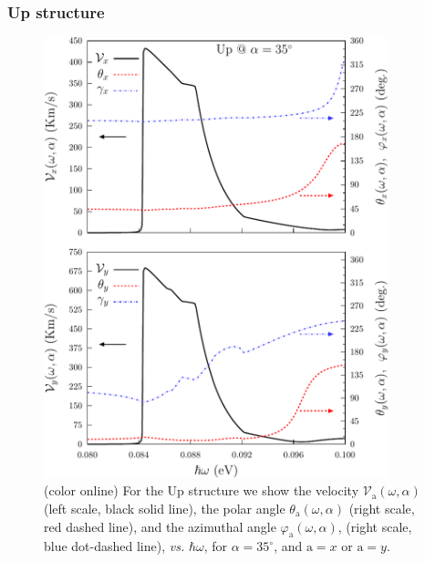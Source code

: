 \documentclass[floatfix,prb,aps,superscriptaddress,showpacs,11pt,preprint,letterpaper]{revtex4}
\def\tama{10cm}
\begin{document}
\subsubsection{Up structure}

\begin{figure}[t]
\centering
\includegraphics[width=\tama]{fig7}
\caption{(color online) For the Up structure we show the velocity
$\mathcal{V}_{\mathrm{a}} (\omega,\alpha)$ (left scale, black solid line), the polar
angle $\theta_{\mathrm{a}} (\omega,\alpha)$ (right scale, red dashed  line), and  the
azimuthal angle $\varphi_{\mathrm{a}} (\omega,\alpha)$, (right scale, blue dot-dashed 
line), {\it vs.} $\hbar\omega$, for $\alpha=35^\circ$, and $\mathrm{a}=x$ or
$\mathrm{a}=y$.}
\label{fig:up-vab-comp-rtp-1}
\end{figure}
\end{document}
